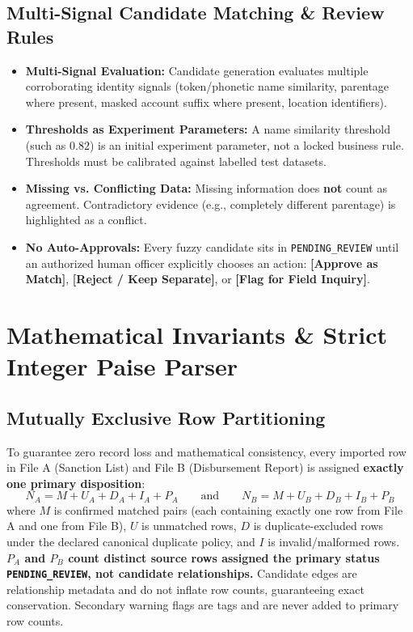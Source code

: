 \documentclass[11pt,a4paper]{article}
\newcommand{\code}[1]{\texttt{#1}}
\begin{document}
\subsection{Multi-Signal Candidate Matching \& Review Rules}
\begin{itemize}
    \item \textbf{Multi-Signal Evaluation:} Candidate generation evaluates multiple corroborating identity signals (token/phonetic name similarity, parentage where present, masked account suffix where present, location identifiers).
    \item \textbf{Thresholds as Experiment Parameters:} A name similarity threshold (such as $0.82$) is an initial experiment parameter, not a locked business rule. Thresholds must be calibrated against labelled test datasets.
    \item \textbf{Missing vs. Conflicting Data:} Missing information does \textbf{not} count as agreement. Contradictory evidence (e.g., completely different parentage) is highlighted as a conflict.
    \item \textbf{No Auto-Approvals:} Every fuzzy candidate sits in \code{PENDING\_REVIEW} until an authorized human officer explicitly chooses an action: \textbf{[Approve as Match]}, \textbf{[Reject / Keep Separate]}, or \textbf{[Flag for Field Inquiry]}.
\end{itemize}

\vspace{0.2cm}

\section{Mathematical Invariants \& Strict Integer Paise Parser}

\subsection{Mutually Exclusive Row Partitioning}
To guarantee zero record loss and mathematical consistency, every imported row in File A (Sanction List) and File B (Disbursement Report) is assigned \textbf{exactly one primary disposition}:
\begin{equation}
    N_A = M + U_A + D_A + I_A + P_A \qquad\text{and}\qquad N_B = M + U_B + D_B + I_B + P_B
\end{equation}
where $M$ is confirmed matched pairs (each containing exactly one row from File A and one from File B), $U$ is unmatched rows, $D$ is duplicate-excluded rows under the declared canonical duplicate policy, and $I$ is invalid/malformed rows. \textbf{$P_A$ and $P_B$ count distinct source rows assigned the primary status \code{PENDING\_REVIEW}, not candidate relationships.} Candidate edges are relationship metadata and do not inflate row counts, guaranteeing exact conservation. Secondary warning flags are tags and are never added to primary row counts.
\end{document}
